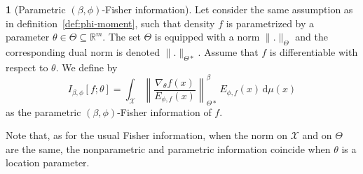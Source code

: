 \documentclass[english,sort&compress]{elsarticle}
\theoremstyle{definition}
\newtheorem{defn}{\protect\definitionname}
\theoremstyle{plain}
\theoremstyle{plain}
\providecommand{\definitionname}{Definition}
\def\dmu{\mathrm{d}\mu}
\def\Rset{\mathbb{R}}
\def\X{\mathcal{X}}
\begin{document}
\begin{defn}[Parametric $(\beta,\phi)$-Fisher information]\label{def:p-phi-Fisher}
  Let consider  the same assumption as  in definition~\ref{def:phi-moment}, such
  that density $f$  is parametrized by a parameter  $\theta \in \Theta \subseteq
  \Rset^m$.  The set  $\Theta$ is equipped with a  norm $\|.\|_{\Theta}$ and the
  corresponding  dual norm  is denoted  $\|.\|_{\Theta*}$.  Assume  that  $f$ is
  differentiable with respect to $\theta$. We define by
  \begin{equation}\label{eq:p-phi-Fisher}
  I_{\beta,\phi}[f;\theta] = \int_\X \left\| \frac{\nabla_\theta
  f(x)}{E_{\phi,f}(x)} \right\|_{\Theta*}^\beta \, E_{\phi,f}(x) \, \dmu(x)
  \end{equation}
  as the parametric $(\beta,\phi)$-Fisher information of $f$.
\end{defn}
%
Note that,  as for the usual  Fisher information, when  the norm on $\X$  and on
$\Theta$  are the same,  the nonparametric  and parametric  information coincide
when $\theta$  is a location  parameter. 


\
\end{document}
